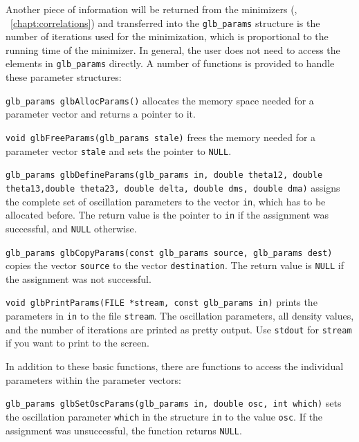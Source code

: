 Another piece of information will be returned from the minimizers 
(\cf, \Chapt~\ref{chapt:correlations}) and transferred
into the {\tt glb\_params} structure is the number
of iterations used for the minimization, which is proportional to the
running time of the minimizer. In general, the user does not need to
access the elements in {\tt glb\_params} directly. A number of functions
is provided to handle these parameter structures:
\begin{function}
{\tt glb\_params glbAllocParams()} allocates the memory space
needed for a parameter vector and returns a pointer to it.
\end{function}
\begin{function}
{\tt void glbFreeParams(glb\_params stale)} frees the memory
needed for a parameter vector {\tt stale} and sets the pointer to {\tt NULL}.
\end{function}
\begin{function}
{\tt glb\_params glbDefineParams(glb\_params in, double theta12, double theta13,double theta23, double delta, double dms, double dma)} assigns
the complete set of oscillation parameters to the vector {\tt in}, which has
to be allocated before. The return value is the pointer to {\tt in} if 
the assignment was successful, and {\tt NULL} otherwise.
\end{function}
\begin{function}
 {\tt glb\_params glbCopyParams(const glb\_params source, glb\_params dest)}
 copies the vector {\tt source} to the vector {\tt destination}. The return
 value is {\tt NULL} if the assignment was not successful.
\end{function}
\begin{function}
{\tt void glbPrintParams(FILE *stream, const glb\_params in)} prints the
parameters in {\tt in} to the file {\tt stream}. The oscillation
parameters, all density values, and the number of iterations are
printed as pretty output. Use {\tt stdout} for {\tt stream} if you want
to print to the screen.
\end{function}
In addition to these basic functions, there are functions to access
the individual parameters within the parameter vectors:
\begin{function}
{\tt glb\_params glbSetOscParams(glb\_params in, double osc, int which)}
sets the oscillation parameter {\tt which} in the structure {\tt in}
to the value {\tt osc}. If the assignment was unsuccessful, the 
function returns {\tt NULL}.
\end{function}
